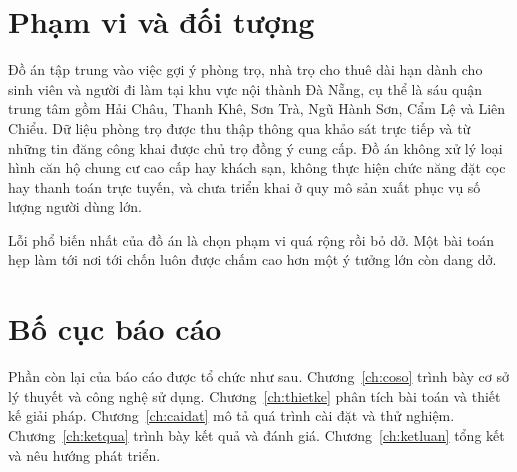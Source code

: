 \section{Phạm vi và đối tượng}

Đồ án tập trung vào việc gợi ý phòng trọ, nhà trọ cho thuê dài hạn dành cho
sinh viên và người đi làm tại khu vực nội thành Đà Nẵng, cụ thể là sáu
quận trung tâm gồm Hải Châu, Thanh Khê, Sơn Trà, Ngũ Hành Sơn, Cẩm Lệ và
Liên Chiểu. Dữ liệu phòng trọ được thu thập thông qua khảo sát trực tiếp và
từ những tin đăng công khai được chủ trọ đồng ý cung cấp. Đồ án không xử lý
loại hình căn hộ chung cư cao cấp hay khách sạn, không thực hiện chức năng
đặt cọc hay thanh toán trực tuyến, và chưa triển khai ở quy mô sản xuất
phục vụ số lượng người dùng lớn.

\begin{luuy}
Lỗi phổ biến nhất của đồ án là chọn phạm vi quá rộng rồi bỏ dở. Một bài toán
hẹp làm tới nơi tới chốn luôn được chấm cao hơn một ý tưởng lớn còn dang dở.
\end{luuy}

\section{Bố cục báo cáo}

Phần còn lại của báo cáo được tổ chức như sau. Chương~\ref{ch:coso} trình
bày cơ sở lý thuyết và công nghệ sử dụng. Chương~\ref{ch:thietke} phân tích
bài toán và thiết kế giải pháp. Chương~\ref{ch:caidat} mô tả quá trình cài
đặt và thử nghiệm. Chương~\ref{ch:ketqua} trình bày kết quả và đánh giá.
Chương~\ref{ch:ketluan} tổng kết và nêu hướng phát triển.
